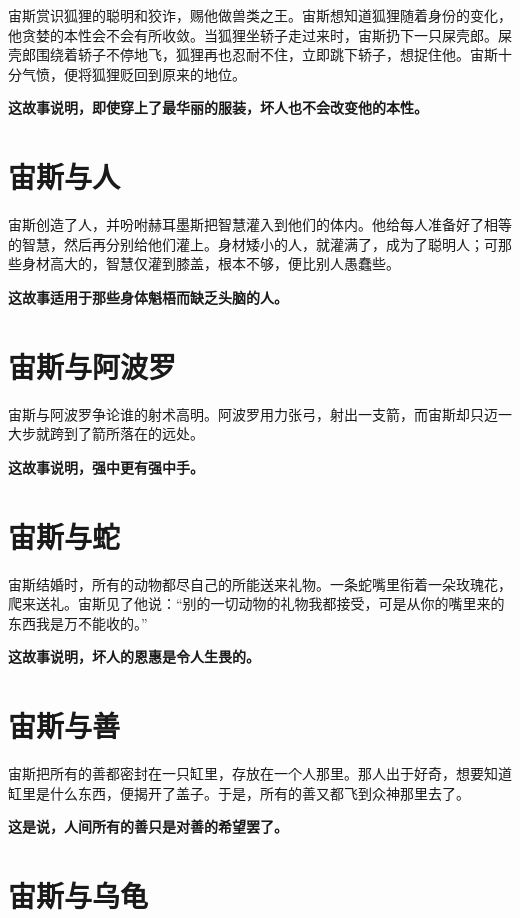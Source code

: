 宙斯赏识狐狸的聪明和狡诈，赐他做兽类之王。宙斯想知道狐狸随着身份的变化，他贪婪的本性会不会有所收敛。当狐狸坐轿子走过来时，宙斯扔下一只屎壳郎。屎壳郎围绕着轿子不停地飞，狐狸再也忍耐不住，立即跳下轿子，想捉住他。宙斯十分气愤，便将狐狸贬回到原来的地位。

{\bfseries \color{red}这故事说明，即使穿上了最华丽的服装，坏人也不会改变他的本性。}

\section{宙斯与人}

宙斯创造了人，并吩咐赫耳墨斯把智慧灌入到他们的体内。他给每人准备好了相等的智慧，然后再分别给他们灌上。身材矮小的人，就灌满了，成为了聪明人；可那些身材高大的，智慧仅灌到膝盖，根本不够，便比别人愚蠢些。

{\bfseries \color{red}这故事适用于那些身体魁梧而缺乏头脑的人。}

\section{宙斯与阿波罗}

宙斯与阿波罗争论谁的射术高明。阿波罗用力张弓，射出一支箭，而宙斯却只迈一大步就跨到了箭所落在的远处。

{\bfseries \color{red}这故事说明，强中更有强中手。}

\section{宙斯与蛇}

宙斯结婚时，所有的动物都尽自己的所能送来礼物。一条蛇嘴里衔着一朵玫瑰花，爬来送礼。宙斯见了他说：“别的一切动物的礼物我都接受，可是从你的嘴里来的东西我是万不能收的。”

{\bfseries \color{red}这故事说明，坏人的恩惠是令人生畏的。}

\section{宙斯与善}

宙斯把所有的善都密封在一只缸里，存放在一个人那里。那人出于好奇，想要知道缸里是什么东西，便揭开了盖子。于是，所有的善又都飞到众神那里去了。

{\bfseries \color{red}这是说，人间所有的善只是对善的希望罢了。}

\section{宙斯与乌龟}

